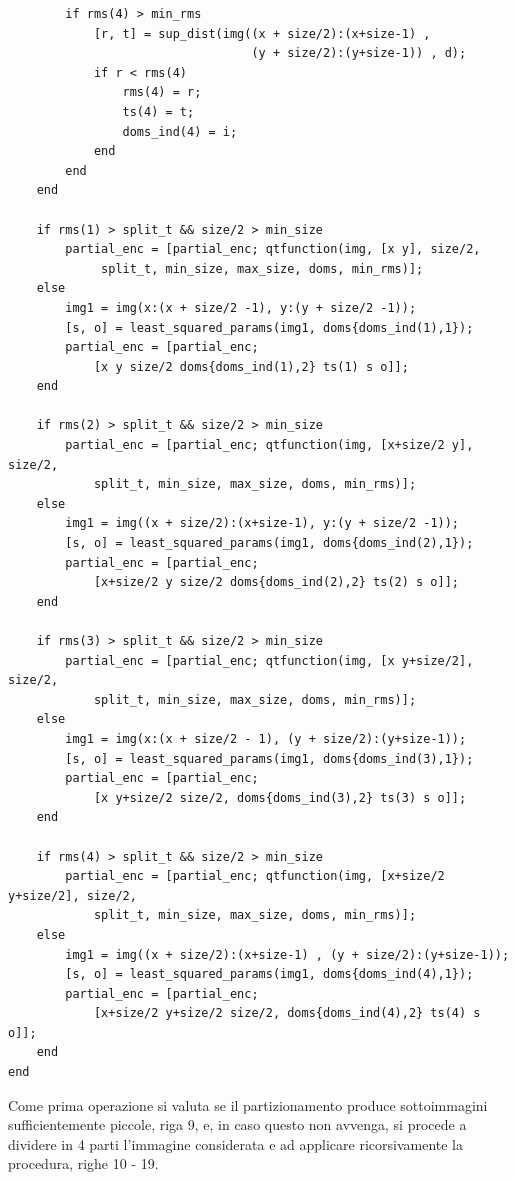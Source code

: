 \documentclass[11pt,a4paper,appendixprefix=true,numbers=noenddot]{scrreprt}
\begin{document}
\begin{verbatim}
        if rms(4) > min_rms
            [r, t] = sup_dist(img((x + size/2):(x+size-1) , 
                                  (y + size/2):(y+size-1)) , d);
            if r < rms(4)
                rms(4) = r;
                ts(4) = t;
                doms_ind(4) = i;
            end
        end        
    end

    if rms(1) > split_t && size/2 > min_size
        partial_enc = [partial_enc; qtfunction(img, [x y], size/2,
             split_t, min_size, max_size, doms, min_rms)];
    else
        img1 = img(x:(x + size/2 -1), y:(y + size/2 -1));
        [s, o] = least_squared_params(img1, doms{doms_ind(1),1});
        partial_enc = [partial_enc; 
            [x y size/2 doms{doms_ind(1),2} ts(1) s o]];
    end

    if rms(2) > split_t && size/2 > min_size
        partial_enc = [partial_enc; qtfunction(img, [x+size/2 y], size/2, 
            split_t, min_size, max_size, doms, min_rms)];
    else
        img1 = img((x + size/2):(x+size-1), y:(y + size/2 -1));
        [s, o] = least_squared_params(img1, doms{doms_ind(2),1});
        partial_enc = [partial_enc; 
            [x+size/2 y size/2 doms{doms_ind(2),2} ts(2) s o]];
    end

    if rms(3) > split_t && size/2 > min_size
        partial_enc = [partial_enc; qtfunction(img, [x y+size/2], size/2, 
            split_t, min_size, max_size, doms, min_rms)];
    else
        img1 = img(x:(x + size/2 - 1), (y + size/2):(y+size-1));
        [s, o] = least_squared_params(img1, doms{doms_ind(3),1});
        partial_enc = [partial_enc; 
            [x y+size/2 size/2, doms{doms_ind(3),2} ts(3) s o]];
    end

    if rms(4) > split_t && size/2 > min_size
        partial_enc = [partial_enc; qtfunction(img, [x+size/2 y+size/2], size/2, 
            split_t, min_size, max_size, doms, min_rms)];
    else
        img1 = img((x + size/2):(x+size-1) , (y + size/2):(y+size-1));
        [s, o] = least_squared_params(img1, doms{doms_ind(4),1});
        partial_enc = [partial_enc; 
            [x+size/2 y+size/2 size/2, doms{doms_ind(4),2} ts(4) s o]];
    end
end
\end{verbatim}

Come prima operazione si valuta se il partizionamento produce sottoimmagini sufficientemente piccole, riga 9, e, in caso questo non avvenga, si procede a dividere in 4 parti l'immagine considerata e ad applicare ricorsivamente la procedura, righe 10 - 19. 
\end{document}
